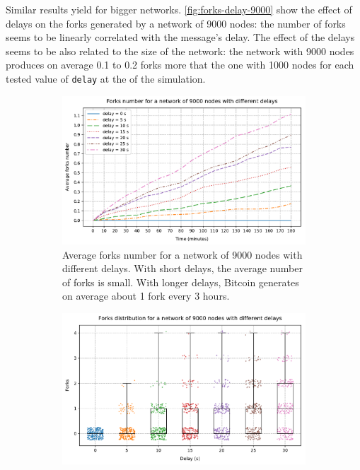 \medskip
Similar results yield for bigger networks.
\cref{fig:forks-delay-9000} show the effect of delays on the forks generated by a network of \num{9000} nodes:
the number of forks seems to be linearly correlated with the message's delay.
The effect of the delays seems to be also related to the size of the network:
the network with \num{9000} nodes produces on average \num{0.1} to \num{0.2} forks more that the one with \num{1000} nodes for each tested value of \texttt{delay} at the of the simulation.

\begin{figure}[h]
	\begin{subfigure}{\textwidth}
		\centering
		\includegraphics[width=\myplotswitdth \columnwidth]{plots/forks_delay_9000_linechart}
		\vspace*{0.25cm}
		\caption{
			Average forks number for a network of \num{9000} nodes with different delays.
			With short delays, the average number of forks is small.
			With longer delays, Bitcoin generates on average about \num{1} fork every \num{3} hours.
		}
		\vspace*{0.75cm}
	\end{subfigure}
	\begin{subfigure}{\textwidth}
		\centering
		\vspace*{0.25cm}
		\includegraphics[width=\myplotswitdth \columnwidth]{plots/forks_delay_9000_boxplot}

\end{subfigure}
\end{figure}
